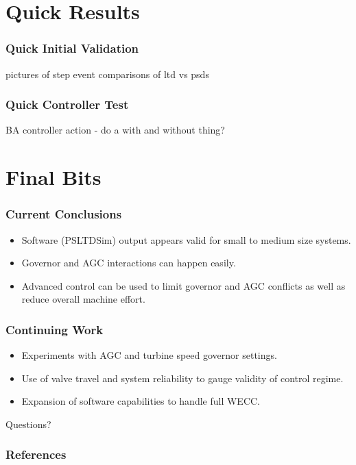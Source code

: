 \documentclass[14pt, unknownkeysallowed]{beamer}
\begin{document}
\section{Quick Results}
\begin{frame}
\frametitle{Quick Initial Validation}
pictures of step event comparisons of ltd vs psds
\end{frame}
\begin{frame}
\frametitle{Quick Controller Test}
BA controller action - do a with and without thing?
\end{frame}
\section{Final Bits}
\begin{frame}
\frametitle{Current Conclusions}
\begin{itemize}
	\item Software (PSLTDSim) output appears valid for small to medium size systems.
	\item Governor and AGC interactions can happen easily.
	\item Advanced control can be used to limit governor and AGC conflicts as well as reduce overall machine effort.
\end{itemize}
\end{frame}
\begin{frame}
\frametitle{Continuing Work}
\begin{itemize}
\item Experiments with AGC and turbine speed governor settings.
\item Use of valve travel and system reliability to gauge validity of control regime.
\item Expansion of software capabilities to handle full WECC.
\end{itemize}
\end{frame}

\begin{frame}
{\centering\Huge{Questions?}}
\end{frame}

\begin{frame}[allowframebreaks]
\frametitle{References}
\renewcommand*{\bibfont}{\scriptsize} %
\printbibliography
\end{frame}
\end{document}
